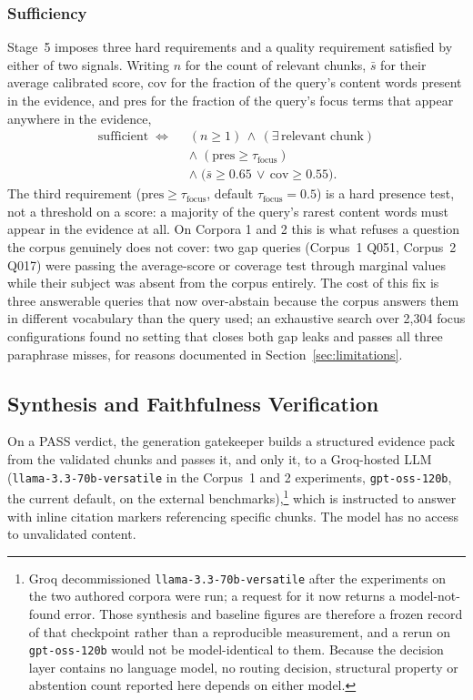 \documentclass[conference]{IEEEtran}
\begin{document}
\subsubsection{Sufficiency}
\label{sec:sufficiency}
Stage~5 imposes three hard requirements and a quality requirement
satisfied by either of two signals. Writing $n$ for the count of
relevant chunks, $\bar{s}$ for their average calibrated score,
$\mathrm{cov}$ for the fraction of the query's content words present
in the evidence, and $\mathrm{pres}$ for the fraction of the query's
focus terms that appear anywhere in the evidence,
\begin{equation}
\begin{split}
\mathrm{sufficient} \;\Longleftrightarrow\;\;
& (n \geq 1)\,\wedge\,(\exists\,\text{relevant chunk})\\[2pt]
& \wedge\;(\mathrm{pres} \geq \tau_{\text{focus}})\\[2pt]
& \wedge\;\bigl(\bar{s} \geq 0.65 \,\vee\, \mathrm{cov} \geq 0.55\bigr).
\end{split}
\label{eq:suff}
\end{equation}
The third requirement ($\mathrm{pres} \geq \tau_{\text{focus}}$,
default $\tau_{\text{focus}} = 0.5$) is a hard presence test, not a
threshold on a score: a majority of the query's rarest content words
must appear in the evidence at all. On Corpora 1 and 2 this is what refuses
a question the corpus genuinely does not cover: two gap queries (Corpus~1 Q051,
Corpus~2 Q017) were passing the average-score or coverage test through marginal values
while their subject was absent from the corpus entirely. The cost of
this fix is three answerable queries that now over-abstain because the
corpus answers them in different vocabulary than the query used;
an exhaustive search over 2{,}304 focus configurations found no setting
that closes both gap leaks and passes all three paraphrase misses,
for reasons documented in Section~\ref{sec:limitations}.


\subsection{Synthesis and Faithfulness Verification}
\label{sec:synthesis}
On a PASS verdict, the generation gatekeeper builds a structured evidence
pack from the validated chunks and passes it, and only it, to a
Groq-hosted LLM (\texttt{llama-3.3-70b-versatile} in the Corpus~1 and 2
experiments, \texttt{gpt-oss-120b}, the current default, on the external
benchmarks),\footnote{Groq decommissioned \texttt{llama-3.3-70b-versatile}
after the experiments on the two authored corpora were run; a request for it
now returns a model-not-found error. Those synthesis and baseline figures are
therefore a frozen record of that checkpoint rather than a reproducible
measurement, and a rerun on \texttt{gpt-oss-120b} would not be model-identical
to them. Because the decision layer contains no language model, no routing
decision, structural property or abstention count reported here depends on
either model.} which is instructed to answer with inline
citation markers referencing specific chunks. The model has no access to
unvalidated content.
\end{document}
